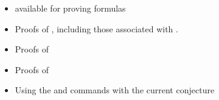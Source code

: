 
\begin{itemize}
\item {} available for proving formulas
\item Proofs of , including those
associated with . 
\item Proofs of 
\item Proofs of 
\item Using the  and  commands with the 
current conjecture
\end{itemize}
